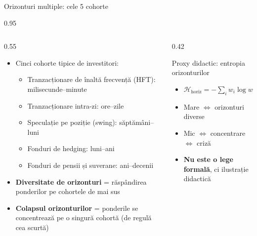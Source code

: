 \documentclass[9pt, aspectratio=169, t]{beamer}
\begin{document}
\begin{frame}[shrink=15]{Orizonturi multiple: cele 5 cohorte}
\begin{cminipage}{0.95\textwidth}
\begin{columns}[T]
\begin{column}{0.55\textwidth}
\begin{itemize}\setlength{\itemsep}{1pt}
    \item Cinci cohorte tipice de investitori:
    \begin{itemize}\setlength{\itemsep}{0pt}
        \item Tranzacționare de înaltă frecvență (HFT): milisecunde--minute
        \item Tranzacționare intra-zi: ore--zile
        \item Speculație pe poziție (swing): săptămâni--luni
        \item Fonduri de hedging: luni--ani
        \item Fonduri de pensii și suverane: ani--decenii
    \end{itemize}
    \item \textbf{Diversitate de orizonturi} = răspândirea ponderilor pe cohortele de mai sus
    \item \textbf{Colapsul orizonturilor} = ponderile se concentrează pe o singură cohortă (de regulă cea scurtă)
\end{itemize}
\end{column}
\begin{column}{0.42\textwidth}
\begin{exampleblock}{Proxy didactic: entropia orizonturilor}
\begin{itemize}\setlength{\itemsep}{0pt}
    \item $\mathcal{H}_{\text{horiz}}=-\sum_i w_i\log w_i$
    \item Mare $\Leftrightarrow$ orizonturi diverse
    \item Mic $\Leftrightarrow$ concentrare $\Leftrightarrow$ criză
    \item \textbf{Nu este o lege formală}, ci ilustrație didactică
\end{itemize}
\end{exampleblock}
\end{column}
\end{columns}
\end{cminipage}
\end{frame}
\end{document}
